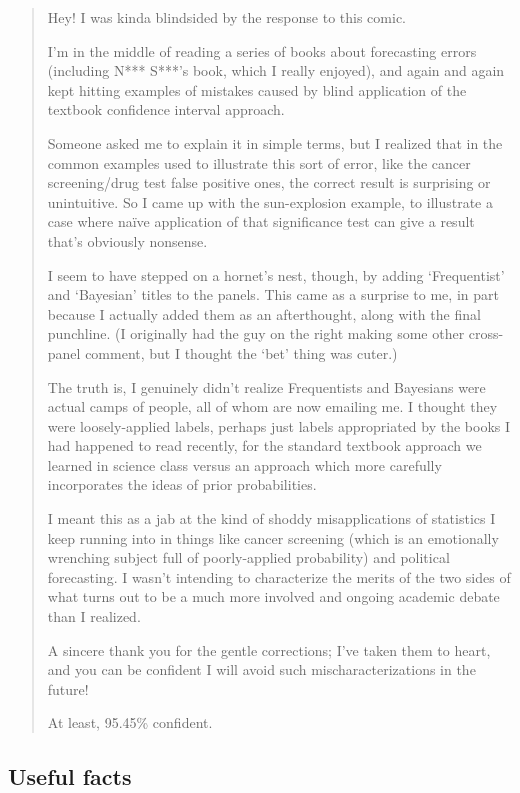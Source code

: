 \documentclass[11pt,a4paper]{scrartcl}
\begin{document}
\begin{quote}
Hey! I was kinda blindsided by the response to this comic.

I'm in the middle of reading a series of books about forecasting
errors (including N*** S***'s book, which I really enjoyed), and
again and again kept hitting examples of mistakes caused by blind
application of the textbook confidence interval approach.

Someone asked me to explain it in simple terms, but I realized that in
the common examples used to illustrate this sort of error, like the
cancer screening/drug test false positive ones, the correct result is
surprising or unintuitive. So I came up with the sun-explosion
example, to illustrate a case where na\"ive application of that
significance test can give a result that's obviously nonsense.

I seem to have stepped on a hornet's nest, though, by adding
`Frequentist' and `Bayesian' titles to the panels. This came as a
surprise to me, in part because I actually added them as an
afterthought, along with the final punchline. (I originally had the
guy on the right making some other cross-panel comment, but I thought
the `bet' thing was cuter.)

The truth is, I genuinely didn't realize Frequentists and Bayesians
were actual camps of people, all of whom are now emailing me. I thought
they were loosely-applied labels, perhaps just labels appropriated by
the books I had happened to read recently, for the standard textbook
approach we learned in science class versus an approach which more
carefully incorporates the ideas of prior probabilities.

I meant this as a jab at the kind of shoddy misapplications of
statistics I keep running into in things like cancer screening (which
is an emotionally wrenching subject full of poorly-applied
probability) and political forecasting. I wasn't intending to
characterize the merits of the two sides of what turns out to be a
much more involved and ongoing academic debate than I realized.

A sincere thank you for the gentle corrections; I've taken them to
heart, and you can be confident I will avoid such mischaracterizations
in the future!

At least, 95.45\% confident.
\end{quote}

\subsection*{Useful facts}
\end{document}
